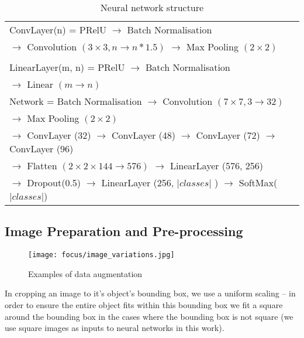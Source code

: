 \begin{table}[h]
  \centering
    \caption{Neural network structure }
\begin{tabular}{ l } 

\toprule

 ConvLayer(n) = PRelU $\rightarrow$ Batch Normalisation \\ 
 $\rightarrow$  Convolution $(3\times3, n \rightarrow n * 1.5)$ $\rightarrow$  Max Pooling $(2\times2)$ \\
\\
 LinearLayer(m, n)  = PRelU $\rightarrow$ Batch Normalisation \\  $\rightarrow$  Linear $(m \rightarrow n)$ \\
\toprule
  Network = Batch Normalisation $\rightarrow$
 Convolution $(7\times7, 3 \rightarrow 32)$ \\
 $\rightarrow$ Max Pooling $(2\times2)$   \\

  $\rightarrow$ ConvLayer (32) $\rightarrow$  ConvLayer (48) $\rightarrow$ ConvLayer (72) $\rightarrow$ ConvLayer (96)   \\
  
  
  $\rightarrow$ Flatten $(2\times2\times144 \rightarrow 576)$ $\rightarrow$ LinearLayer (576, 256) \\
  
  $\rightarrow$ Dropout(0.5) $\rightarrow$ LinearLayer (256, $\vert classes \vert$ )  $\rightarrow$  SoftMax($\vert classes \vert$) \\
  
    
       
\toprule
\end{tabular}

\label{fig:focus_network}
\end{table}




\subsection {Image Preparation and Pre-processing}


\begin{figure*}[t]
    \caption{Examples of data augmentation }
\centering
\texttt{[image: focus/image\_variations.jpg]}
\label{fig:focus_variations}
\end{figure*}


In cropping an image to it's object's bounding box, we use a uniform scaling -- in order to ensure the entire object fits within this bounding box we fit a square around the bounding box in the cases where the bounding box is not square (we use square images as inputs to neural networks in this work).

